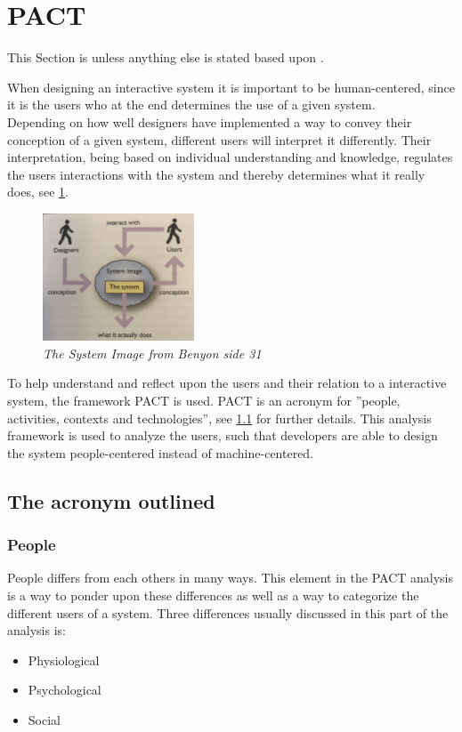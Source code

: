 \section{PACT}\label{sec:PACT}
This Section is unless anything else is stated based upon \cite{Benyon}.

When designing an interactive system it is important to be human-centered, since it is the users who at the end determines the use of a given system.
\\\indent
Depending on how well designers have implemented a way to convey their conception of a given system, different users will interpret it differently. 
Their interpretation, being based on individual understanding and knowledge, regulates the users interactions with the system and thereby determines what it really does, see \cref{fig:PACT-SystemImage}.

\begin{figure}[H]
	\centering
	\includegraphics[width=0.4\textwidth]{billeder/SystemImage-Benyon.png}
	\caption{\textit{The System Image from {\color{red}Benyon side 31}}}
	\label{fig:PACT-SystemImage}
\end{figure}

To help understand and reflect upon the users and their relation to a interactive system, the framework PACT is used. 
PACT is an acronym for ''people, activities, contexts and technologies'', see \cref{sec:PACT-method} for further details.
This analysis framework is used to analyze the users, such that developers are able to design the system people-centered instead of machine-centered.

\subsection{The acronym outlined}\label{sec:PACT-method}
\subsubsection{People}
People differs from each others in many ways.
This element in the PACT analysis is a way to ponder upon these differences as well as a way to categorize the different users of a system. 
Three differences usually discussed in this part of the analysis is:
\begin{itemize}
	\item Physiological
	\item Psychological
	\item Social
\end{itemize}

